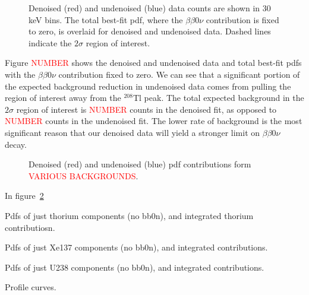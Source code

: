 \begin{figure}
\begin{center}
\end{center}
\renewcommand{\baselinestretch}{1}
\small\normalsize
\begin{quote}
\caption{Denoised (red) and undenoised (blue) data counts are shown in 30 keV bins.  The total best-fit pdf, where the $\beta\beta 0\nu$ contribution is fixed to zero, is overlaid for denoised and undenoised data.  Dashed lines indicate the $2\sigma$ region of interest.}
\label{fig:DenoisedComparison_DataTotalPdf}
\end{quote}
\end{figure}
\renewcommand{\baselinestretch}{2}
\small\normalsize

Figure \textcolor{red}{NUMBER} shows the denoised and undenoised data and total best-fit pdfs with the $\beta\beta 0\nu$ contribution fixed to zero.  We can see that a significant portion of the expected background reduction in undenoised data comes from pulling the region of interest away from the $^{208}$Tl peak.  The total expected background in the $2\sigma$ region of interest is \textcolor{red}{NUMBER} counts in the denoised fit, as opposed to \textcolor{red}{NUMBER} counts in the undenoised fit.  The lower rate of background is the most significant reason that our denoised data will yield a stronger limit on $\beta\beta 0\nu$ decay.

\begin{figure}
\begin{center}
\end{center}
\renewcommand{\baselinestretch}{1}
\small\normalsize
\begin{quote}
\caption{Denoised (red) and undenoised (blue) pdf contributions form \textcolor{red}{VARIOUS BACKGROUNDS}.}
\label{fig:DenoisedComparison_PdfComponents}
\end{quote}
\end{figure}
\renewcommand{\baselinestretch}{2}
\small\normalsize

In figure~\ref{fig:DenoisedComparison_PdfComponents}


Pdfs of just thorium components (no bb0n), and integrated thorium contributiosn.

Pdfs of just Xe137 components (no bb0n), and integrated contributions.

Pdfs of just U238 components (no bb0n), and integrated contributions.

Profile curves.

